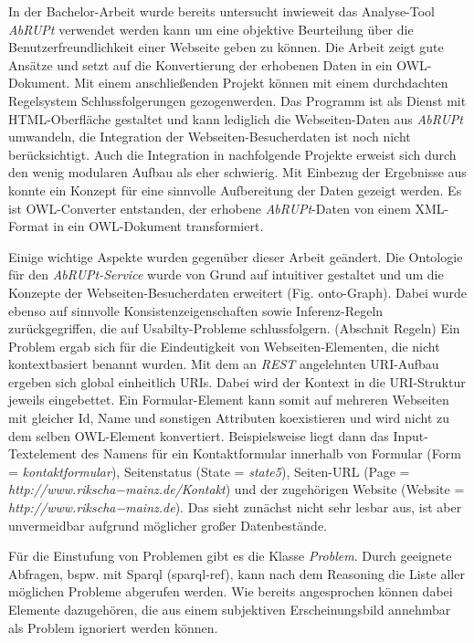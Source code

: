 \documentclass[runningheads,a4paper]{llncs}
\begin{document}
In der Bachelor-Arbeit \cite{Brieger} wurde bereits untersucht inwieweit das Analyse-Tool \textit{AbRUPt} \cite{url_abrupt} verwendet werden kann um eine objektive Beurteilung über die Benutzerfreundlichkeit einer Webseite geben zu können. 
Die Arbeit zeigt gute Ansätze und setzt auf die Konvertierung der erhobenen Daten in ein OWL-Dokument. 
Mit einem anschließenden Projekt können mit einem durchdachten Regelsystem Schlussfolgerungen gezogenwerden. 
Das Programm ist als Dienst mit HTML-Oberfläche gestaltet und kann lediglich die Webseiten-Daten aus \textit{AbRUPt} umwandeln, die Integration der Webseiten-Besucherdaten ist noch nicht berücksichtigt. 
Auch die Integration in nachfolgende Projekte erweist sich durch den wenig modularen Aufbau als eher schwierig. 
Mit Einbezug der Ergebnisse aus \cite{Martin} konnte ein Konzept für eine sinnvolle Aufbereitung der Daten gezeigt werden. 
Es ist OWL-Converter entstanden, der erhobene \textit{AbRUPt}-Daten von einem XML-Format in ein OWL-Dokument transformiert.


Einige wichtige Aspekte wurden gegenüber dieser Arbeit geändert. 
Die Ontologie für den \textit{AbRUPt-Service} wurde von Grund auf intuitiver gestaltet und um die Konzepte der Webseiten-Besucherdaten erweitert (Fig. onto-Graph). 
Dabei wurde ebenso auf sinnvolle Konsistenzeigenschaften sowie Inferenz-Regeln zurückgegriffen, die auf Usabilty-Probleme schlussfolgern. (Abschnit Regeln)
Ein Problem ergab sich für die Eindeutigkeit von Webseiten-Elementen, die nicht kontextbasiert benannt wurden. 
Mit dem an \textit{REST} angelehnten URI-Aufbau ergeben sich global einheitlich URIs.
Dabei wird der Kontext in die URI-Struktur jeweils eingebettet. 
Ein Formular-Element kann somit auf mehreren Webseiten mit gleicher Id, Name und sonstigen Attributen koexistieren und wird nicht zu dem selben OWL-Element konvertiert. 
Beispielsweise liegt dann das Input-Textelement des Namens für ein Kontaktformular innerhalb von Formular (Form = \textit{kontaktformular}), Seitenstatus (State = \textit{state5}), Seiten-URL (Page = \textit{http://www.rikscha−mainz.de/Kontakt}) und der zugehörigen Website (Website = \textit{http://www.rikscha−mainz.de}).
Das sieht zunächst nicht sehr lesbar aus, ist aber unvermeidbar aufgrund möglicher großer Datenbestände. 

 
Für die Einstufung von Problemen gibt es die Klasse \textit{Problem}. 
Durch geeignete Abfragen, bspw. mit Sparql (sparql-ref), kann nach dem Reasoning die Liste aller möglichen Probleme abgerufen werden. 
Wie bereits angesprochen können dabei Elemente dazugehören, die aus einem subjektiven Erscheinungsbild annehmbar als Problem ignoriert werden können.
\end{document}
